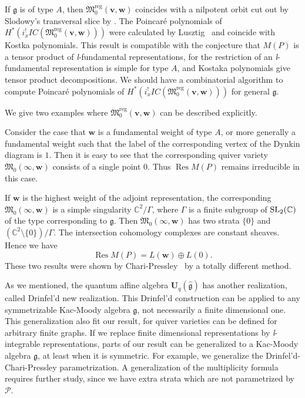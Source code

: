\documentclass[12pt]{amsart}
\def\Bbb{\mathbb}
\def\frak{\mathfrak}
\theoremstyle{definition}
\theoremstyle{remark}
\numberwithin{equation}{subsection}
\newcommand{\C}{{\Bbb C}}
\newcommand{\SL}{\operatorname{\rm SL}}
\newcommand{\M}{{\frak M}} %
\newcommand{\Mreg}{{\frak M_0^{\operatorname{reg}}}}
\newcommand{\bv}{{\mathbf v}} %
\newcommand{\bw}{{\mathbf w}} %
\newcommand{\Ua}{{\mathbf U}_q(\widehat{\mathfrak g})} %
\begin{document}
If $\mathfrak g$ is of type $A$, then $\Mreg(\bv,\bw)$ coincides with
a nilpotent orbit cut out by Slodowy's transversal slice by
\cite[8.4]{Na-quiver}. The Poincar\'e polynomials of $H^*(i_x^!
IC(\Mreg(\bv,\bw)))$ were calculated by Lusztig~\cite{Lu-Green} and
coincide with Kostka polynomials. This result is compatible with the
conjecture that $M(P)$ is a tensor product of {\it l\/}-fundamental
representations, for the restriction of an {\it l\/}-fundamental
representation is simple for type $A$, and Kostaka polynomials give
tensor product decompositions.
%
We should have a combinatorial algorithm to compute Poincar\'e
polynomials of $H^*(i_x^!IC(\Mreg(\bv,\bw)))$ for general $\mathfrak
g$.

We give two examples where $\Mreg(\bv,\bw)$ can be described
explicitly.

Consider the case that $\bw$ is a fundamental weight of type $A$, or
more generally a fundamental weight such that the label of the
corresponding vertex of the Dynkin diagram is $1$.
%
Then it is easy to see that the corresponding quiver variety
$\M_0(\infty,\bw)$ consists of a single point $0$. Thus
$\operatorname{Res}M(P)$ remains irreducible in this case.

If $\bw$ is the highest weight of the adjoint representation, the
corresponding $\M_0(\infty,\bw)$ is a simple singularity
$\C^2/\Gamma$, where $\Gamma$ is a finite subgroup of $\SL_2(\C)$
of the type corresponding to $\mathfrak g$. Then
$\M_0(\infty,\bw)$ has two strata $\{0\}$ and
$(\C^2\setminus\{0\})/\Gamma$.
%
The intersection cohomology complexes are constant sheaves. Hence we
have
\[
  \operatorname{Res}M(P) = L(\bw)\oplus L(0).
\]
%
These two results were shown by Chari-Pressley~\cite{CP-ex} by a totally
different method.

As we mentioned, the quantum affine algebra $\Ua$ has another
realization, called Drinfel'd new realization.
%
This Drinfel'd construction can be applied to any symmetrizable
Kac-Moody algebra $\mathfrak g$, not necessarily a finite dimensional
one.
%
This generalization also fit our result, for quiver varieties can be
defined for arbitrary finite graphs.
%
If we replace finite dimensional representations by {\it
l\/}-integrable representations, parts of our result can be
generalized to a Kac-Moody algebra $\mathfrak g$, at least when it is
symmetric.
%
For example, we generalize the Drinfel'd-Chari-Pressley parametrization.
A generalization of the multiplicity formula requires further study,
since we have extra strata which are not parametrized by $\mathcal P$.
\end{document}
